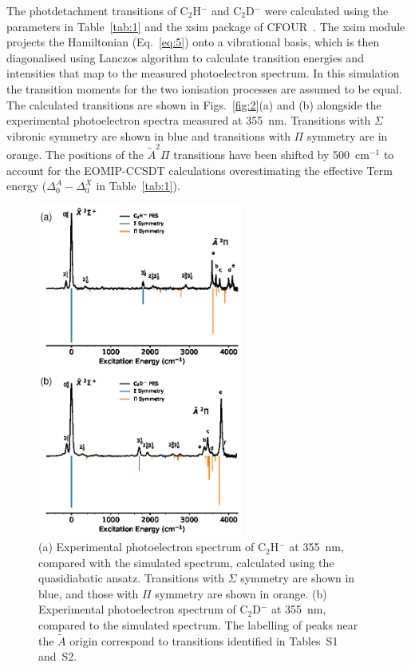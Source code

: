 \documentclass[aip,graphicx]{revtex4-1}
\begin{document}
The photdetachment transitions of C$_2$H$^-$ and C$_2$D$^-$ were calculated using the parameters in Table~\ref{tab:1} and the xsim package of CFOUR~\cite{dev20}. The xsim module projects the Hamiltonian (Eq.~\ref{eq:5}) onto a vibrational basis, which is then diagonalised using Lanczos algorithm to calculate transition energies and intensities that map to the measured photoelectron spectrum. In this simulation the transition moments for the two ionisation processes are assumed to be equal. The calculated transitions are shown in Figs.~\ref{fig:2}(a) and (b) alongside the experimental photoelectron spectra measured at 355~nm. Transitions with $\Sigma$ vibronic symmetry are shown in blue and transitions with $\Pi$ symmetry are in orange. The positions of the $\tilde{A} ^2\Pi$ transitions have been shifted by 500~cm$^{-1}$ to account for the EOMIP-CCSDT calculations overestimating the effective Term energy ($\Delta^A_0-\Delta^X_0$ in Table~\ref{tab:1}).

\begin{figure}[th!]
	\includegraphics[width=0.6\textwidth]{figures/Fig3}
	\caption{(a) Experimental photoelectron spectrum of C$_2$H$^-$ at 355~nm, compared with the simulated spectrum, calculated using the quasidiabatic ansatz. Transitions with $\Sigma$ symmetry are shown in blue, and those with $\Pi$ symmetry are shown in orange. (b) Experimental photoelectron spectrum of C$_2$D$^-$ at 355~nm, compared to the simulated spectrum. The labelling of peaks near the $\tilde{A}$ origin correspond to transitions identified in Tables~S1 and~S2.}
	\label{fig:3}
\end{figure}
\end{document}
